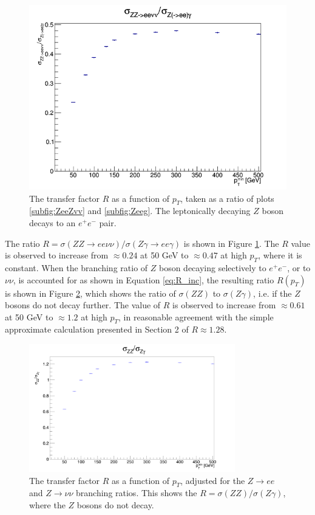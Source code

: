 \documentclass[11pt,a4paper]{report}
\begin{document}
\begin{figure}[H]
	\centering
	\includegraphics[scale=0.7]{Ratio_default.png}
	\caption{The transfer factor $R$ as a function of $p_T$, taken as a ratio of plots \ref{subfig:ZeeZvv} and \ref{subfig:Zeeg}. The leptonically decaying $Z$ boson decays to an $e^+e^-$ pair.}
	\label{fig:Rcurve}
\end{figure}
The ratio $R = \sigma(ZZ\rightarrow ee\nu\nu)/\sigma(Z\gamma\rightarrow ee\gamma)$ is shown in Figure \ref{fig:Rcurve}. The $R$ value is observed to increase from $\approx 0.24$ at 50 GeV to $\approx 0.47$ at high $p_T$, where it is constant. When the branching ratio of $Z$ boson decaying selectively to $e^+e^-$, or to $\nu\nu$, is accounted for as shown in Equation \ref{eq:R_inc}, the resulting ratio $R(p_T)$ is shown in Figure \ref{fig:RcurveBR}, which shows the ratio of $\sigma(ZZ)$ to $\sigma(Z\gamma)$, i.e. if the $Z$ bosons do not decay further. The value of $R$ is observed to increase from $\approx 0.61$ at 50 GeV to $\approx 1.2$ at high $p_T$, in reasonable agreement with the simple approximate calculation presented in Section 2 of $R \approx 1.28$.
\begin{figure}[H]
	\centering
	\includegraphics[width = 0.8\textwidth]{Ratio_with_BR.png}
	\caption{The transfer factor $R$ as a function of $p_T$, adjusted for the $Z\rightarrow ee$ and $Z\rightarrow \nu\nu$ branching ratios. This shows the $R=\sigma(ZZ)/\sigma(Z\gamma)$, where the $Z$ bosons do not decay.}
	\label{fig:RcurveBR}
\end{figure}
\end{document}
